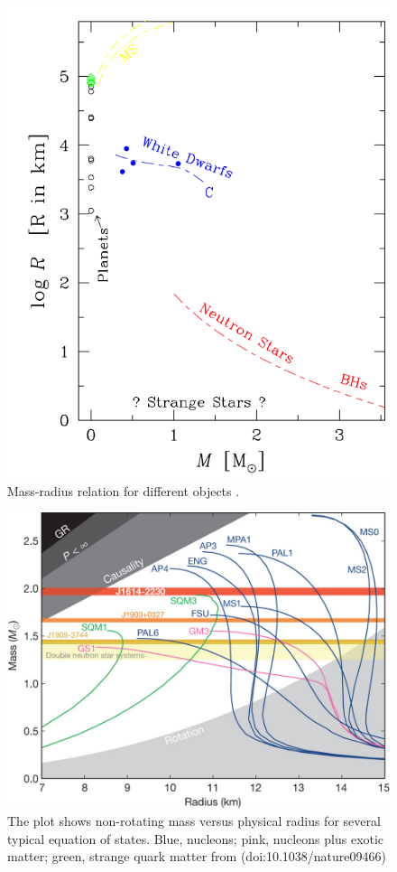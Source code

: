 \begin{figure}
                \centering
                \includegraphics[scale=0.3]{assets/images/mass-radius.png}
                \caption{Mass-radius relation for different objects \citep{de2008stars}.}
                \label{fig:massrad}
\end{figure}

\begin{figure}[]
        \centering
\includegraphics[scale=.3]{assets/images/es.jpg}
\caption{The plot shows non-rotating mass versus physical radius for several typical equation of states.  Blue, nucleons; pink, nucleons plus exotic matter; green, strange quark matter from (doi:10.1038/nature09466)}
\label{fig:nsmod}
\end{figure}


